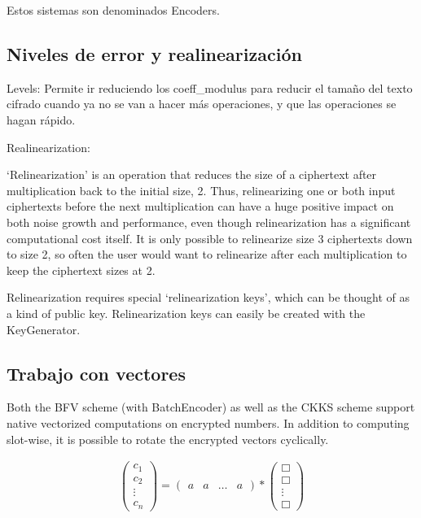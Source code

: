 Estos sistemas son denominados Encoders.

\subsection{Niveles de error y realinearización}


Levels: Permite ir reduciendo los coeff\_modulus para reducir el tamaño del texto cifrado cuando ya no se van a hacer más operaciones, y que las operaciones se hagan rápido.

Realinearization:

`Relinearization' is an operation that reduces the size of a ciphertext after
multiplication back to the initial size, 2. Thus, relinearizing one or both
input ciphertexts before the next multiplication can have a huge positive
impact on both noise growth and performance, even though relinearization has
a significant computational cost itself. It is only possible to relinearize
size 3 ciphertexts down to size 2, so often the user would want to relinearize
after each multiplication to keep the ciphertext sizes at 2.

Relinearization requires special `relinearization keys', which can be thought
of as a kind of public key. Relinearization keys can easily be created with
the KeyGenerator.


\subsection{Trabajo con vectores}

Both the BFV scheme (with BatchEncoder) as well as the CKKS scheme support native
vectorized computations on encrypted numbers. In addition to computing slot-wise,
it is possible to rotate the encrypted vectors cyclically.


    \begin{gather}
        \begin{pmatrix}
            c_1 \\
            c_2 \\
            \vdots{} \\
            c_n
        \end{pmatrix}
        =
        \begin{pmatrix}
            a & a & \hdots{} &  a
        \end{pmatrix}
         *
        \begin{pmatrix}
            \Box \\
            \Box \\
            \vdots{} \\
            \Box
        \end{pmatrix}
    \end{gather}

